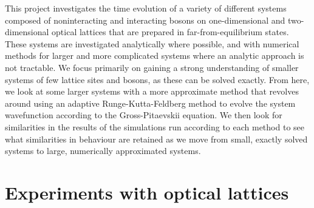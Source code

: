 \documentclass[a4paper, 10pt]{article}
\theoremstyle{plain}
\begin{document}
This project investigates the time evolution of a variety of different systems
composed of noninteracting and interacting bosons on one-dimensional and
two-dimensional optical lattices that are prepared in far-from-equilibrium
states. These systems are investigated analytically where possible, and with
numerical methods for larger and more complicated systems where an analytic
approach is not tractable. We focus primarily on gaining a strong
understanding of smaller systems of few lattice sites and bosons, as these
can be solved exactly. From here, we look at some larger systems with a more
approximate method that revolves around using an adaptive Runge-Kutta-Feldberg
method to evolve the system wavefunction according to the Gross-Pitaevskii
equation. We then look for similarities in the results of the simulations run
according to each method to see what similarities in behaviour are retained as
we move from small, exactly solved systems to large, numerically approximated
systems.

\newpage
\section{Experiments with optical lattices}
\end{document}

